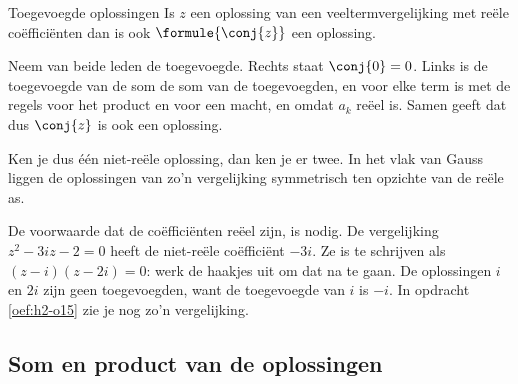 \begin{theorie}
\begin{stelling}{Toegevoegde oplossingen}
Is $z$ een oplossing van een veeltermvergelijking met reële coëfficiënten
dan is ook $\formule{\conj{z}}$ een oplossing.
\end{stelling}

\begin{bewijs}
Neem van beide leden de toegevoegde. Rechts staat $\conj{0} = 0$. Links is de toegevoegde van de som de som van de toegevoegden, en voor elke term is
met de regels voor het product en voor een macht, en omdat $a_k$ reëel is. Samen geeft dat
dus $\conj{z}$ is ook een oplossing.
\end{bewijs}
\end{theorie}

Ken je dus één niet-reële oplossing, dan ken je er twee. In het vlak van Gauss liggen de oplossingen van zo'n vergelijking symmetrisch ten opzichte van de reële as.


De voorwaarde dat de coëfficiënten reëel zijn, is nodig. De vergelijking $z^2 - 3iz - 2 = 0$ heeft de niet-reële coëfficiënt $-3i$. Ze is te schrijven als $(z - i)(z - 2i) = 0$: werk de haakjes uit om dat na te gaan. De oplossingen $i$ en $2i$ zijn geen toegevoegden, want de toegevoegde van $i$ is $-i$. In opdracht \ref{oef:h2-o15} zie je nog zo'n vergelijking.

\subsection{Som en product van de oplossingen}


